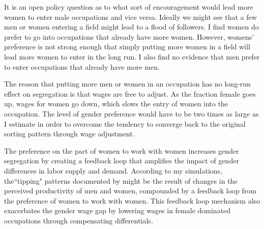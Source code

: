 \documentclass[12pt]{article}
\begin{document}
It is an open policy question as to what sort of encouragement would lead more women to enter male occupations and vice versa. Ideally we might see that a few men or women entering a field might lead to a flood of followers. I find women do prefer to go into occupations that already have more women. However, womens' preference is not strong enough that simply putting more women in a field will lead more women to enter in the long run. I also find no evidence that men prefer to enter occupations that already have more men. 



The reason that putting more men or women in an occupation has no long-run effect on segregation is that wages are free to adjust. As the fraction female goes up, wages for women go down, which slows the entry of women into the occupation. The level of gender preference would have to be two times as large as I estimate in order to overcome the tendency to converge back to the original sorting pattern through wage adjustment.



The preference on the part of women to work with women increases gender segregation by creating a feedback loop that amplifies the impact of gender differences in labor supply and demand. According to my simulations, the``tipping" patterns documented by  might be the result of changes in the perceived productivity of men and women, compounded by a feedback loop from the preference of women to work with women. This feedback loop mechanism also exacerbates the gender wage gap by lowering wages in female dominated occupations through compensating differentials.
\end{document}
